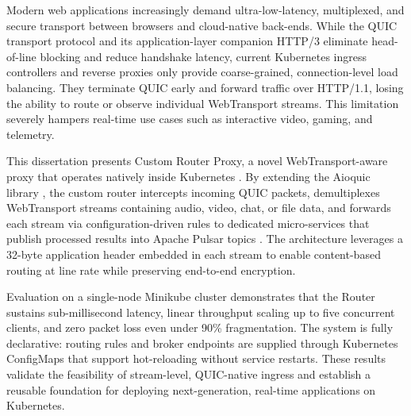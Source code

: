 \documentclass[a4paper, 12pt, oneside]{report}         %
\begin{document}

\thesistitlepage                                  %
\setcounter{secnumdepth}{4}
\setcounter{tocdepth}{4}

\hypersetup{pageanchor=false}
\thesisdeclarationpage                            %

\thesispermissionpage                             %
\hypersetup{pageanchor=true}

\begin{thesisabstract}                            %
Modern web applications increasingly demand ultra-low-latency, multiplexed, and secure transport between browsers and cloud-native back-ends. While the QUIC transport protocol \cite{rfc9000} and its application-layer companion HTTP/3 \cite{rfc9114} eliminate head-of-line blocking and reduce handshake latency, current Kubernetes ingress controllers and reverse proxies only provide coarse-grained, connection-level load balancing. They terminate QUIC early and forward traffic over HTTP/1.1, losing the ability to route or observe individual WebTransport streams. This limitation severely hampers real-time use cases such as interactive video, gaming, and telemetry.

This dissertation presents Custom Router Proxy, a novel WebTransport-aware proxy that operates natively inside Kubernetes \cite{kubernetes-docs}. By extending the Aioquic library \cite{aioquic-repo}, the custom router intercepts incoming QUIC packets, demultiplexes WebTransport streams containing audio, video, chat, or file data, and forwards each stream via configuration-driven rules to dedicated micro-services that publish processed results into Apache Pulsar topics \cite{pulsar-helm-repo}. The architecture leverages a 32-byte application header embedded in each stream to enable content-based routing at line rate while preserving end-to-end encryption.

Evaluation on a single-node Minikube cluster \cite{minikube-docs} demonstrates that the Router sustains sub-millisecond latency, linear throughput scaling up to five concurrent clients, and zero packet loss even under 90\% fragmentation. The system is fully declarative: routing rules and broker endpoints are supplied through Kubernetes ConfigMaps that support hot-reloading without service restarts. These results validate the feasibility of stream-level, QUIC-native ingress and establish a reusable foundation for deploying next-generation, real-time applications on Kubernetes.
\end{thesisabstract}
\end{document}
